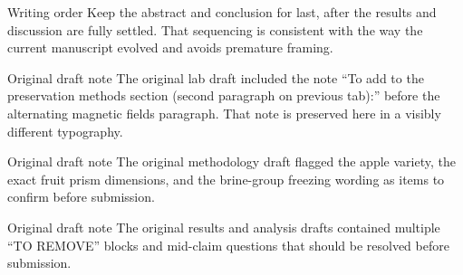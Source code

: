 \begin{editorialnote}{Writing order}
Keep the abstract and conclusion for last, after the results and discussion are fully settled. That sequencing is consistent with the way the current manuscript evolved and avoids premature framing.
\end{editorialnote}

\begin{editorialnote}{Original draft note}
The original lab draft included the note ``To add to the preservation methods section (second paragraph on previous tab):'' before the alternating magnetic fields paragraph. That note is preserved here in a visibly different typography.
\end{editorialnote}

\begin{editorialnote}{Original draft note}
The original methodology draft flagged the apple variety, the exact fruit prism dimensions, and the brine-group freezing wording as items to confirm before submission.
\end{editorialnote}

\begin{editorialnote}{Original draft note}
The original results and analysis drafts contained multiple ``TO REMOVE'' blocks and mid-claim questions that should be resolved before submission.
\end{editorialnote}


